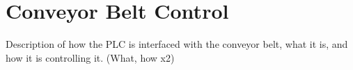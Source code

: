 \section{Conveyor Belt Control \label{sec:conveyor_belt_sec}}

Description of how the PLC is interfaced with the conveyor belt, what it is, and how it is controlling it. (What, how x2)

